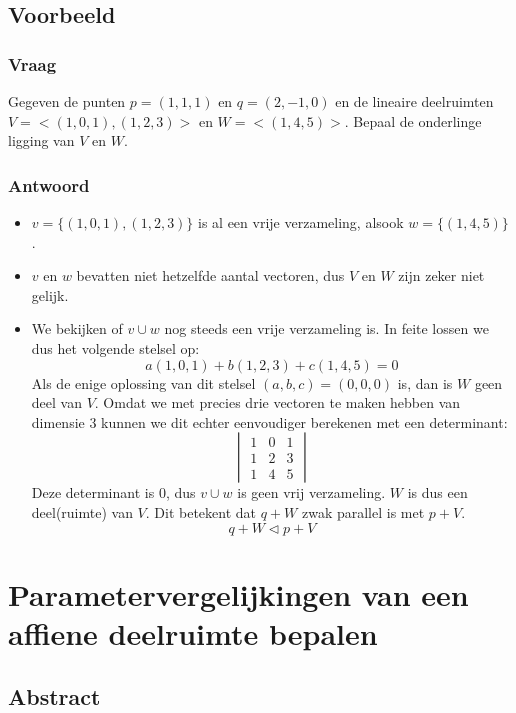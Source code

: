 \documentclass[main.tex]{subfiles}
\begin{document}
\subsection{Voorbeeld}

\subsubsection{Vraag}
\begin{center}
  Gegeven de punten $p=(1,1,1)$ en $q=(2,-1,0)$ en de lineaire deelruimten $V=<(1,0,1),(1,2,3)>$ en $W=<(1,4,5)>$. Bepaal de onderlinge ligging van $V$ en $W$.
\end{center}

\subsubsection{Antwoord}
\begin{itemize}
\item $v=\{(1,0,1),(1,2,3)\}$ is al een vrije verzameling, alsook $w=\{(1,4,5)\}$.
\item $v$ en $w$ bevatten niet hetzelfde aantal vectoren, dus $V$ en $W$ zijn zeker niet gelijk.
\item We bekijken of $v\cup w$ nog steeds een vrije verzameling is.
  In feite lossen we dus het volgende stelsel op:
  \[
  a(1,0,1) + b(1,2,3) + c(1,4,5) = 0
  \]
  Als de enige oplossing van dit stelsel $(a,b,c) = (0,0,0)$ is, dan is $W$ geen deel van $V$.
  Omdat we met precies drie vectoren te maken hebben van dimensie $3$ kunnen we dit echter eenvoudiger berekenen met een determinant:
  \[
  \begin{vmatrix}
    1 & 0 & 1\\
    1 & 2 & 3\\
    1 & 4 & 5
  \end{vmatrix}
  \]
  Deze determinant is $0$, dus $v\cup w$ is geen vrij verzameling. $W$ is dus een deel(ruimte) van $V$.
  Dit betekent dat $q+W$ zwak parallel is met $p+V$.
  \[ q+W \triangleleft p+V \]
\end{itemize}

\newpage
\section{Parametervergelijkingen van een affiene deelruimte bepalen}
\subsection{Abstract}
\end{document}
